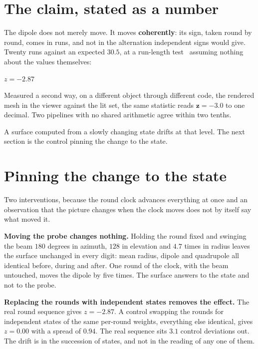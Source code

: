 \section{The claim, stated as a number}

The dipole does not merely move. It moves \textbf{coherently}: its sign, taken round by round, comes in runs, and not in the alternation independent signs would give. Twenty runs against an expected \(30.5\), at a run-length test~\cite{src:Wald-and-Wolfowitz-1940} assuming nothing about the values themselves:

\begin{center}
\(z = -2.87\)
\end{center}

Measured a second way, on a different object through different code, the rendered mesh in the viewer against the lit set, the same statistic reads \(\mathbf{z = -3.0}\) to one decimal. Two pipelines with no shared arithmetic agree within two tenths.

A surface computed from a slowly changing state drifts at that level. The next section is the control pinning the change to the state.

\section{Pinning the change to the state}

Two interventions, because the round clock advances everything at once and an observation that the picture changes when the clock moves does not by itself say what moved it.

\textbf{Moving the probe changes nothing.} Holding the round fixed and swinging the beam \(180\) degrees in azimuth, \(128\) in elevation and \(4.7\) times in radius leaves the surface unchanged in every digit: mean radius, dipole and quadrupole all identical before, during and after. One round of the clock, with the beam untouched, moves the dipole by five times. The surface answers to the state and not to the probe.

\textbf{Replacing the rounds with independent states removes the effect.} The real round sequence gives \(z = -2.87\). A control swapping the rounds for independent states of the same per-round weights, everything else identical, gives \(z = 0.00\) with a spread of \(0.94\). The real sequence sits \(3.1\) control deviations out. The drift is in the succession of states, and not in the reading of any one of them.

